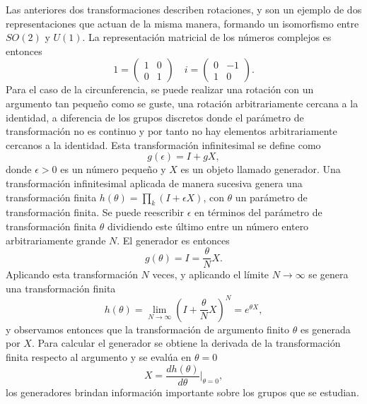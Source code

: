 Las anteriores dos transformaciones describen rotaciones, y son un ejemplo de dos representaciones que actuan de la misma manera, formando un isomorfismo entre $SO(2)$ y $U(1)$. La representación matricial de los números complejos es entonces
\begin{equation}
  1 = \begin{pmatrix}
    1 & 0 \\ 0 & 1
  \end{pmatrix} \quad i = \begin{pmatrix}
    0 & -1 \\ 1 & 0
  \end{pmatrix}.
\end{equation}
Para el caso de la circunferencia, se puede realizar una rotación con un argumento tan pequeño como se guste, una rotación arbitrariamente cercana a la identidad, a diferencia de los grupos discretos  donde el parámetro de transformación no es continuo y por tanto no hay elementos arbitrariamente cercanos a la identidad. Esta transformación infinitesimal se define como
\begin{equation}
  g(\epsilon) = I + gX,
\end{equation}
donde $\epsilon>0$ es un número pequeño y $X$ es un objeto llamado generador. Una transformación infinitesimal aplicada de manera sucesiva genera una transformación finita $h(\theta) = \prod_k (I+\epsilon X)$, con $\theta$ un parámetro de transformación finita. Se puede reescribir $\epsilon$ en términos del parámetro de transformación finita $\theta$ dividiendo este último entre un número entero arbitrariamente grande $N$. El generador es entonces
\begin{equation}
  g(\theta) = I = \frac{\theta}{N} X.
\end{equation}
Aplicando esta transformación $N$ veces, y aplicando el límite $N\to\infty$ se genera una transformación finita
\begin{equation}
  h(\theta) = \lim_{N\to\infty}\left( I + \frac{\theta}{N}X \right)^N = e^{\theta X},
\end{equation}
y observamos entonces que la transformación de argumento finito $\theta$ es generada por $X$. Para calcular el generador se obtiene la derivada de la transformación finita respecto al argumento y se evalúa en $\theta=0$
\begin{equation}\label{eq:generator}
  X = \frac{dh(\theta)}{d\theta} \bigg|_{\theta=0},
\end{equation}
los generadores brindan información importante sobre los grupos que se estudian.
